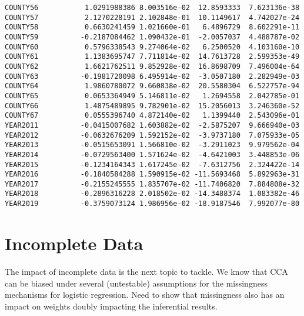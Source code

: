 \documentclass[
  letterpaper,
  DIV=11,
  numbers=noendperiod]{scrartcl}
\newenvironment{Shaded}{\begin{snugshade}}{\end{snugshade}}
\newcommand{\DecValTok}[1]{\textcolor[rgb]{0.68,0.00,0.00}{#1}}
\newcommand{\FunctionTok}[1]{\textcolor[rgb]{0.28,0.35,0.67}{#1}}
\newcommand{\NormalTok}[1]{\textcolor[rgb]{0.00,0.23,0.31}{#1}}
\newcommand{\OtherTok}[1]{\textcolor[rgb]{0.00,0.23,0.31}{#1}}
\newcommand{\SpecialCharTok}[1]{\textcolor[rgb]{0.37,0.37,0.37}{#1}}
\begin{document}
\begin{verbatim}
COUNTY56           1.0291988386 8.003516e-02  12.8593333  7.623136e-38
COUNTY57           2.1270228191 2.102848e-01  10.1149617  4.742027e-24
COUNTY58           0.6630241459 1.021660e-01   6.4896729  8.602291e-11
COUNTY59          -0.2187084462 1.090432e-01  -2.0057037  4.488787e-02
COUNTY60           0.5796338543 9.274064e-02   6.2500520  4.103160e-10
COUNTY61           1.1383695747 7.711814e-02  14.7613728  2.599353e-49
COUNTY62           1.6621762511 9.852928e-02  16.8698709  7.496004e-64
COUNTY63          -0.1981720098 6.495914e-02  -3.0507180  2.282949e-03
COUNTY64           1.9860780072 9.660838e-02  20.5580304  6.522757e-94
COUNTY65           0.0653364949 5.146811e-02   1.2694558  2.042785e-01
COUNTY66           1.4875489895 9.782901e-02  15.2056013  3.246360e-52
COUNTY67           0.0555396740 4.872140e-02   1.1399440  2.543096e-01
YEAR2011          -0.0415007682 1.603882e-02  -2.5875207  9.666940e-03
YEAR2012          -0.0632676209 1.592152e-02  -3.9737180  7.075933e-05
YEAR2013          -0.0515653091 1.566810e-02  -3.2911023  9.979562e-04
YEAR2014          -0.0729563400 1.571624e-02  -4.6421003  3.448853e-06
YEAR2015          -0.1234164343 1.617245e-02  -7.6312756  2.324422e-14
YEAR2016          -0.1840584288 1.590915e-02 -11.5693468  5.892963e-31
YEAR2017          -0.2155245555 1.835707e-02 -11.7406820  7.884808e-32
YEAR2018          -0.2896316228 2.018502e-02 -14.3488374  1.083382e-46
YEAR2019          -0.3759073124 1.986956e-02 -18.9187546  7.992077e-80
\end{verbatim}

\hypertarget{incomplete-data}{%
\section{Incomplete Data}\label{incomplete-data}}

The impact of incomplete data is the next topic to tackle. We know that
CCA can be biased under several (untestable) assumptions for the
missingness mechanisms for logistic regression. Need to show that
missingness also has an impact on weights doubly impacting the
inferential results.

\begin{Shaded}
\end{Shaded}
\end{document}
